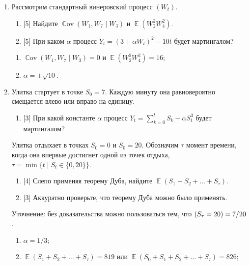 \documentclass[12pt]{article}
\DeclareMathOperator{\Cov}{\mathbb{C}ov}
\DeclareMathOperator{\Var}{\mathbb{V}ar}
\let\P\relax
\DeclareMathOperator{\P}{\mathbb{P}}
\DeclareMathOperator{\E}{\mathbb{E}}
\newcommand \NN{\mathbb{N}}
\newcommand{\dGamma}{\mathrm{Gamma}}
\begin{document}
\begin{enumerate}
    \item 
    Рассмотрим стандартный винеровский процесс $(W_t)$.
    \begin{enumerate}
        \item {[5]} Найдите $\Cov(W_1, W_7 \mid W_3)$ и $\E(W_2^2 W_4^2)$.
        \item {[5]} При каком $\alpha$ процесс $Y_t = (3 + \alpha W_t)^2 - 10t$ будет мартингалом?
    \end{enumerate}

    \begin{enumerate}
        \item $\Cov(W_1, W_7 \mid W_3) = 0$ и $\E(W_2^2 W_4^2) = 16$;
        \item $\alpha = \pm \sqrt{10}$.
    \end{enumerate}
    
    \item Улитка стартует в точке $S_0 = 7$. 
    Каждую минуту она равновероятно смещается влево или вправо на единицу. 
    \begin{enumerate}
        \item {[3]} При какой константе $\alpha$ процесс $Y_t = \sum_{k=0}^t S_k - \alpha S_t^3$ будет мартингалом?
    \end{enumerate}
    Улитка отдыхает в точках $S_0 = 0$ и $S_0 = 20$.
    Обозначим $\tau$ момент времени, когда она впервые достигнет одной из точек отдыха, $\tau = \min\{t \mid S_t \in\{0, 20\}\}$.
    \begin{enumerate}[resume]
        \item {[4]} Слепо применяя теорему Дуба, найдите $\E(S_1 + S_2 +\dots + S_\tau)$.
        \item {[3]} Аккуратно проверьте, что теорему Дуба можно было применять. 
    \end{enumerate}

    Уточнение: без доказательства можно пользоваться тем, что $\P(S_\tau = 20) = 7/20$.

    \begin{enumerate}
        \item $\alpha = 1/3$;
        \item $\E(S_1 + S_2 +\dots + S_\tau) = 819$ или $\E(S_0 + S_1 + S_2 +\dots + S_\tau) = 826$;
    \end{enumerate}



\end{enumerate}
\end{document}
